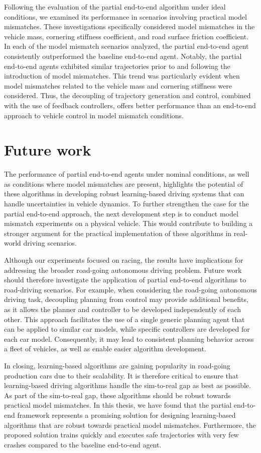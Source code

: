 Following the evaluation of the partial end-to-end algorithm under ideal conditions, we examined its performance in scenarios involving practical model mismatches. 
These investigations specifically considered model mismatches in the vehicle mass, cornering stiffness coefficient, and road surface friction coefficient.
In each of the model mismatch scenarios analyzed, the partial end-to-end agent consistently outperformed the baseline end-to-end agent. 
Notably, the partial end-to-end agents exhibited similar trajectories prior to and following the introduction of model mismatches. 
This trend was particularly evident when model mismatches related to the vehicle mass and cornering stiffness were considered.
Thus, the decoupling of trajectory generation and control, combined with the use of feedback controllers, offers better performance than an end-to-end approach to vehicle control in model mismatch conditions.



\section{Future work}

The performance of partial end-to-end agents under nominal conditions, as well as conditions where model mismatches are present, highlights the potential of these algorithms in developing robust learning-based driving systems that can handle uncertainties in vehicle dynamics.
To further strengthen the case for the partial end-to-end approach, the next development step is to conduct model mismatch experiments on a physical vehicle.
This would contribute to building a stronger argument for the practical implementation of these algorithms in real-world driving scenarios.


Although our experiments focused on racing, the results have implications for addressing the broader road-going autonomous driving problem.
Future work should therefore investigate the application of partial end-to-end algorithms to road-driving scenarios.
For example, when considering the road-going autonomous driving task, decoupling planning from control may provide additional benefits, as it allows the planner and controller to be developed independently of each other.
This approach facilitates the use of a single generic planning agent that can be applied to similar car models, while specific controllers are developed for each car model.
Consequently, it may lead to consistent planning behavior across a fleet of vehicles, as well as enable easier algorithm development.


In closing, learning-based algorithms are gaining popularity in road-going production cars due to their scalability.
It is therefore critical to ensure that learning-based driving algorithms handle the sim-to-real gap as best as possible.
As part of the sim-to-real gap, these algorithms should be robust towards practical model mismatches.
In this thesis, we have found that the partial end-to-end framework represents a promising solution for designing learning-based algorithms that are robust towards practical model mismatches.
Furthermore, the proposed solution trains quickly and executes safe trajectories with very few crashes compared to the baseline end-to-end agent.


